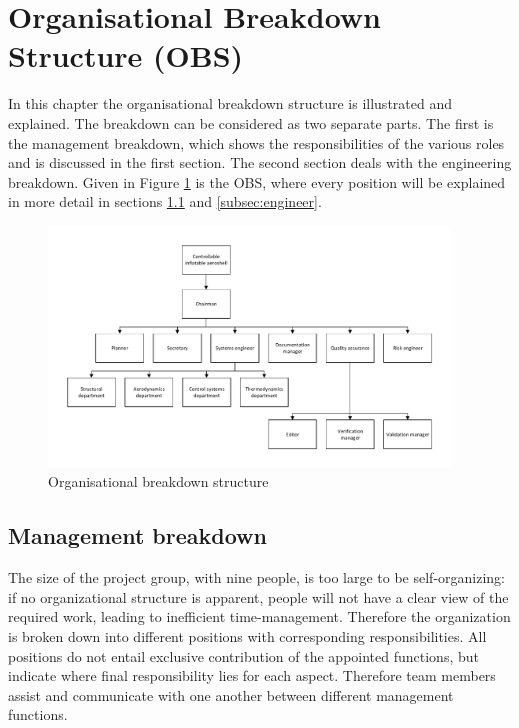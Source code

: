 \section{Organisational Breakdown Structure (OBS)}\label{cha:OBS}
In this chapter the organisational breakdown structure is illustrated and explained. The breakdown can be considered as two separate parts. The first is the management breakdown, which shows the responsibilities of the various roles and is discussed in the first section. The second section deals with the engineering breakdown. Given in Figure \ref{fig:OBS} is the OBS, where every position will be explained in more detail in sections \ref{subsec:management} and \ref{subsec:engineer}.

\begin{figure}[h]
\centering
\includegraphics[width=0.95\textwidth]{./Figure/OBS.pdf}
\caption{Organisational breakdown structure} \label{fig:OBS}
\end{figure}

\subsection{Management breakdown}\label{subsec:management}
The size of the project group, with nine people, is too large to be self-organizing: if no organizational structure is apparent, people will not have a clear view of the required work, leading to inefficient time-management. Therefore the organization is broken down into different positions with corresponding responsibilities. All positions do not entail exclusive contribution of the appointed functions, but indicate where final responsibility lies for each aspect. Therefore team members assist and communicate with one another between different management functions.


